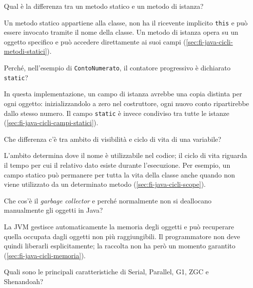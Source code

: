 \begin{exercise}
\label{ex:fi-esercizi-java-cicli-static-differenza}
Qual è la differenza tra un metodo statico e un metodo di istanza?
\end{exercise}

Un metodo statico appartiene alla classe, non ha il ricevente
implicito \texttt{this} e può essere invocato tramite il nome
della classe. Un metodo di istanza opera su un oggetto specifico
e può accedere direttamente ai suoi campi
(\cref{sec:fi-java-cicli-metodi-statici}).

\begin{exercise}
\label{ex:fi-esercizi-java-cicli-static-campi}
Perché, nell'esempio di \texttt{ContoNumerato}, il contatore
progressivo è dichiarato \texttt{static}?
\end{exercise}

In questa implementazione, un campo di istanza avrebbe una copia
distinta per ogni oggetto: inizializzandolo a zero nel costruttore,
ogni nuovo conto ripartirebbe dallo stesso numero. Il campo
\texttt{static} è invece condiviso tra tutte le istanze
(\cref{sec:fi-java-cicli-campi-statici}).

\begin{exercise}
\label{ex:fi-esercizi-java-cicli-scope-lifetime}
Che differenza c'è tra ambito di visibilità e ciclo di vita
di una variabile?
\end{exercise}

L'ambito determina dove il nome è utilizzabile nel codice;
il ciclo di vita riguarda il tempo per cui il relativo dato
esiste durante l'esecuzione. Per esempio, un campo statico
può permanere per tutta la vita della classe anche quando
non viene utilizzato da un determinato metodo
(\cref{sec:fi-java-cicli-scope}).

\begin{exercise}
\label{ex:fi-esercizi-java-cicli-gc}
Che cos'è il \emph{garbage collector} e perché normalmente
non si deallocano manualmente gli oggetti in Java?
\end{exercise}

La JVM gestisce automaticamente la memoria degli oggetti e può
recuperare quella occupata dagli oggetti non più raggiungibili.
Il programmatore non deve quindi liberarli esplicitamente;
la raccolta non ha però un momento garantito
(\cref{sec:fi-java-cicli-memoria}).

\begin{exercise}
\label{ex:fi-esercizi-java-cicli-gc-tipi}
Quali sono le principali caratteristiche di Serial, Parallel,
G1, ZGC e Shenandoah?
\end{exercise}

